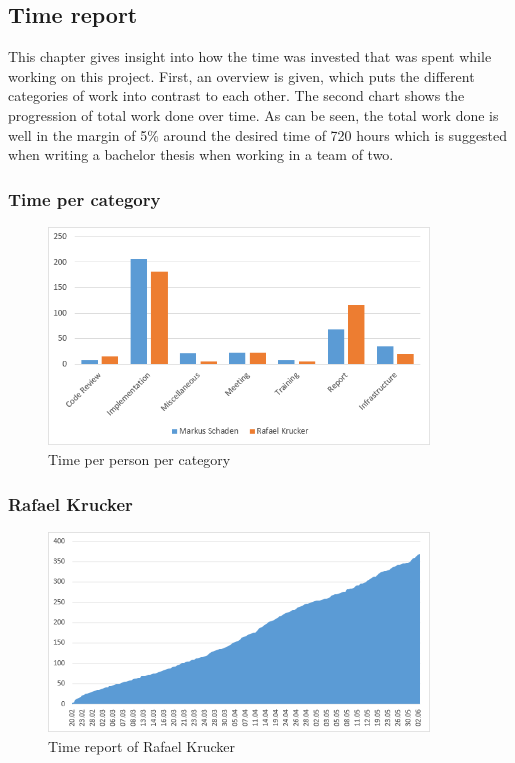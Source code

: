 \clearpage
\subsection{Time report}
This chapter gives insight into how the time was invested that was spent while working on this project. First, an overview is given, which puts the different categories of work into contrast to each other. The second chart shows the progression of total work done over time. As can be seen, the total work done is well in the margin of 5\% around the desired time of 720 hours which is suggested when writing a bachelor thesis when working in a team of two. 
\subsubsection{Time per category}
\begin{figure}[H]
	\centering
	\includegraphics[width=0.9\textwidth]{img/timereport_epics}
	\caption{Time per person per category}
	\label{fig:timereport_epics}
\end{figure}

\subsubsection{Rafael Krucker}
\begin{figure}[H]
	\centering
	\includegraphics[width=0.9\textwidth]{img/timereport_rk}
	\caption{Time report of Rafael Krucker}
	\label{fig:timereport_rafael_krucker}
\end{figure}

